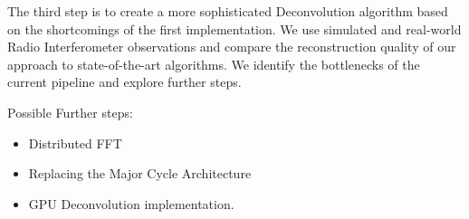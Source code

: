 The third step is to create a more sophisticated Deconvolution algorithm based on the shortcomings of the first implementation. We use simulated and real-world Radio Interferometer observations and compare the reconstruction quality of our approach to state-of-the-art algorithms. We identify the bottlenecks of the current pipeline and explore further steps.

Possible Further steps:
\begin{itemize}
	\item Distributed FFT
	\item Replacing the Major Cycle Architecture
	\item GPU Deconvolution implementation.
\end{itemize}





